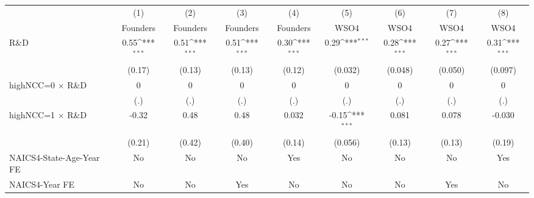 {
\def\sym#1{\ifmmode^{#1}\else\(^{#1}\)\fi}
\begin{tabular}{l*{8}{c}}
\toprule
                    &\multicolumn{1}{c}{(1)}&\multicolumn{1}{c}{(2)}&\multicolumn{1}{c}{(3)}&\multicolumn{1}{c}{(4)}&\multicolumn{1}{c}{(5)}&\multicolumn{1}{c}{(6)}&\multicolumn{1}{c}{(7)}&\multicolumn{1}{c}{(8)}\\
                    &\multicolumn{1}{c}{Founders}&\multicolumn{1}{c}{Founders}&\multicolumn{1}{c}{Founders}&\multicolumn{1}{c}{Founders}&\multicolumn{1}{c}{WSO4}&\multicolumn{1}{c}{WSO4}&\multicolumn{1}{c}{WSO4}&\multicolumn{1}{c}{WSO4}\\
\midrule
R\&D                &        0.55\sym{***}&        0.51\sym{***}&        0.51\sym{***}&        0.30\sym{***}&        0.29\sym{***}&        0.28\sym{***}&        0.27\sym{***}&        0.31\sym{***}\\
                    &      (0.17)         &      (0.13)         &      (0.13)         &      (0.12)         &     (0.032)         &     (0.048)         &     (0.050)         &     (0.097)         \\
\addlinespace
highNCC=0 $\times$ R\&D&           0         &           0         &           0         &           0         &           0         &           0         &           0         &           0         \\
                    &         (.)         &         (.)         &         (.)         &         (.)         &         (.)         &         (.)         &         (.)         &         (.)         \\
\addlinespace
highNCC=1 $\times$ R\&D&       -0.32         &        0.48         &        0.48         &       0.032         &       -0.15\sym{***}&       0.081         &       0.078         &      -0.030         \\
                    &      (0.21)         &      (0.42)         &      (0.40)         &      (0.14)         &     (0.056)         &      (0.13)         &      (0.13)         &      (0.19)         \\
\addlinespace
NAICS4-State-Age-Year FE&          No         &          No         &          No         &         Yes         &          No         &          No         &          No         &         Yes         \\
\addlinespace
NAICS4-Year FE      &          No         &          No         &         Yes         &          No         &          No         &          No         &         Yes         &          No         \\

\end{tabular}}
